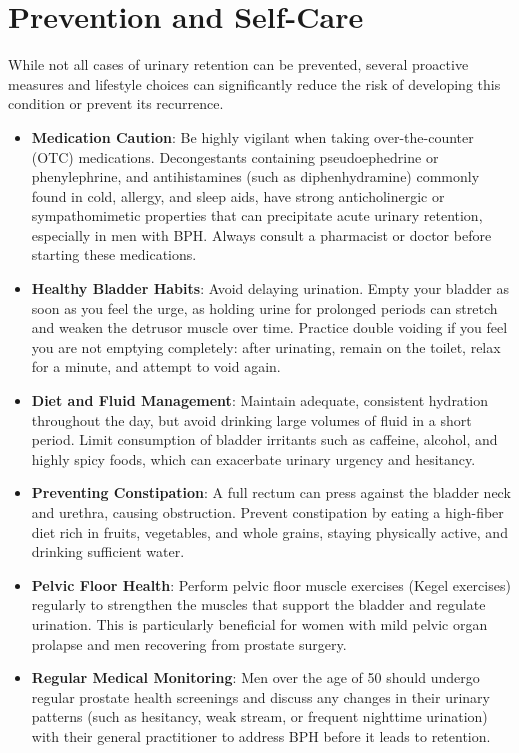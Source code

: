 \section*{Prevention and Self-Care}
While not all cases of urinary retention can be prevented, several proactive measures and lifestyle choices can significantly reduce the risk of developing this condition or prevent its recurrence.
\begin{itemize}
    \item \textbf{Medication Caution}: Be highly vigilant when taking over-the-counter (OTC) medications. Decongestants containing pseudoephedrine or phenylephrine, and antihistamines (such as diphenhydramine) commonly found in cold, allergy, and sleep aids, have strong anticholinergic or sympathomimetic properties that can precipitate acute urinary retention, especially in men with BPH. Always consult a pharmacist or doctor before starting these medications.
    \item \textbf{Healthy Bladder Habits}: Avoid delaying urination. Empty your bladder as soon as you feel the urge, as holding urine for prolonged periods can stretch and weaken the detrusor muscle over time. Practice double voiding if you feel you are not emptying completely: after urinating, remain on the toilet, relax for a minute, and attempt to void again.
    \item \textbf{Diet and Fluid Management}: Maintain adequate, consistent hydration throughout the day, but avoid drinking large volumes of fluid in a short period. Limit consumption of bladder irritants such as caffeine, alcohol, and highly spicy foods, which can exacerbate urinary urgency and hesitancy.
    \item \textbf{Preventing Constipation}: A full rectum can press against the bladder neck and urethra, causing obstruction. Prevent constipation by eating a high-fiber diet rich in fruits, vegetables, and whole grains, staying physically active, and drinking sufficient water.
    \item \textbf{Pelvic Floor Health}: Perform pelvic floor muscle exercises (Kegel exercises) regularly to strengthen the muscles that support the bladder and regulate urination. This is particularly beneficial for women with mild pelvic organ prolapse and men recovering from prostate surgery.
    \item \textbf{Regular Medical Monitoring}: Men over the age of 50 should undergo regular prostate health screenings and discuss any changes in their urinary patterns (such as hesitancy, weak stream, or frequent nighttime urination) with their general practitioner to address BPH before it leads to retention.
\end{itemize}

